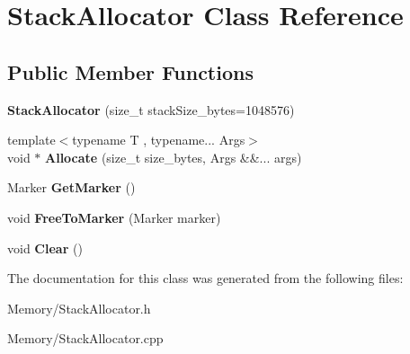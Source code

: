 \hypertarget{classStackAllocator}{}\section{Stack\+Allocator Class Reference}
\label{classStackAllocator}
\subsection*{Public Member Functions}
\begin{DoxyCompactItemize}
\item 
\mbox{\label{classStackAllocator_a65fdd2cfc113232a7337725d33f95a11}} 
{\bfseries Stack\+Allocator} (size\+\_\+t stack\+Size\+\_\+bytes=1048576)
\item 
\mbox{\label{classStackAllocator_a6595866994ee8cf766812f697c93593f}} 
{\footnotesize template$<$typename T , typename... Args$>$ }\\void $\ast$ {\bfseries Allocate} (size\+\_\+t size\+\_\+bytes, Args \&\&... args)
\item 
\mbox{\label{classStackAllocator_ad866ae9dc871d8005698584e84feeabb}} 
Marker {\bfseries Get\+Marker} ()
\item 
\mbox{\label{classStackAllocator_a639dbed0470363c3afc31c7c14a715a6}} 
void {\bfseries Free\+To\+Marker} (Marker marker)
\item 
\mbox{\label{classStackAllocator_a700c8b1319f1942cf0de558f9152e542}} 
void {\bfseries Clear} ()
\end{DoxyCompactItemize}


The documentation for this class was generated from the following files\+:\begin{DoxyCompactItemize}
\item 
Memory/Stack\+Allocator.\+h\item 
Memory/Stack\+Allocator.\+cpp\end{DoxyCompactItemize}
